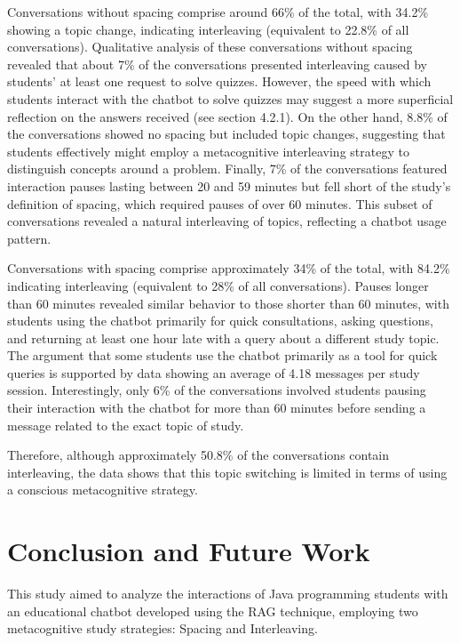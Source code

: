 \documentclass[a4paper,twoside]{article}
\begin{document}
Conversations without spacing comprise around 66\% of the total, with 34.2\%
showing a topic change, indicating interleaving (equivalent to 22.8\% of all
conversations). Qualitative analysis of these conversations without spacing
revealed that about 7\% of the conversations presented interleaving caused by
students' at least one request to solve quizzes. However, the speed with which
students interact with the chatbot to solve quizzes may suggest a more
superficial reflection on the answers received (see section 4.2.1). On the other
hand, 8.8\% of the conversations showed no spacing but included topic changes,
suggesting that students effectively might employ a metacognitive interleaving
strategy to distinguish concepts around a problem. Finally, 7\% of the
conversations featured interaction pauses lasting between 20 and 59 minutes but
fell short of the study's definition of spacing, which required pauses of over
60 minutes. This subset of conversations revealed a natural interleaving of
topics, reflecting a chatbot usage pattern.

Conversations with spacing comprise approximately 34\% of the total, with 84.2\%
indicating interleaving (equivalent to 28\% of all conversations). Pauses longer
than 60 minutes revealed similar behavior to those shorter than 60 minutes, with
students using the chatbot primarily for quick consultations, asking questions,
and returning at least one hour late with a query about a different study topic.
The argument that some students use the chatbot primarily as a tool for quick
queries is supported by data showing an average of 4.18 messages per study
session. Interestingly, only 6\% of the conversations involved students pausing
their interaction with the chatbot for more than 60 minutes before sending a
message related to the exact topic of study.

Therefore, although approximately 50.8\% of the conversations contain
interleaving, the data shows that this topic switching is limited in terms of
using a conscious metacognitive strategy.

\section{Conclusion and Future Work}

This study aimed to analyze the interactions of Java programming students with
an educational chatbot developed using the RAG technique, employing two
metacognitive study strategies: Spacing and Interleaving.
\end{document}
